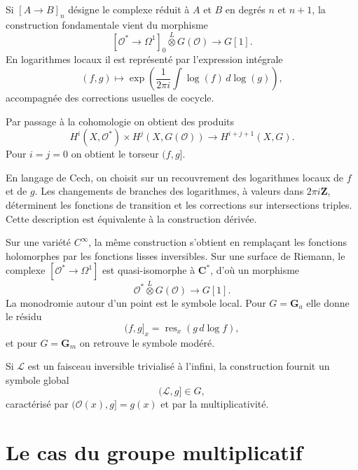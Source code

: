 \documentclass[11pt]{article}
\newcommand{\C}{\mathbf C}
\newcommand{\Z}{\mathbf Z}
\newcommand{\Gm}{\mathbf G_m}
\newcommand{\OO}{\mathcal O}
\newcommand{\LL}{\mathcal L}
\begin{document}
Si $[A\to B]_n$ désigne le complexe réduit à $A$ et $B$ en degrés $n$ et $n+1$, la construction fondamentale vient du morphisme
\begin{equation}\tag{2.2.1}
 [\OO^*\to\Omega^1]_0\overset L\otimes G(\OO)
 \longrightarrow G[1].
\end{equation}
En logarithmes locaux il est représenté par l'expression intégrale
\begin{equation}\tag{2.2.2}
 (f,g)\longmapsto \exp\left(\frac{1}{2\pi i}\int \log(f)\,d\log(g)\right),
\end{equation}
accompagnée des corrections usuelles de cocycle.

Par passage à la cohomologie on obtient des produits
\begin{equation}\tag{2.3.1}
 H^i(X,\OO^*)\times H^j(X,G(\OO))\longrightarrow H^{i+j+1}(X,G).
\end{equation}
Pour $i=j=0$ on obtient le torseur $(f,g]$.

En langage de Cech, on choisit sur un recouvrement des logarithmes locaux de $f$ et de $g$. Les changements de branches des logarithmes, à valeurs dans $2\pi i\Z$, déterminent les fonctions de transition et les corrections sur intersections triples. Cette description est équivalente à la construction dérivée.

Sur une variété $C^\infty$, la même construction s'obtient en remplaçant les fonctions holomorphes par les fonctions lisses inversibles. Sur une surface de Riemann, le complexe $[\OO^*\to\Omega^1]$ est quasi-isomorphe à $\C^*$, d'où un morphisme
\begin{equation}\tag{2.6.1}
 \OO^*\overset L\otimes G(\OO)\longrightarrow G[1].
\end{equation}
La monodromie autour d'un point est le symbole local. Pour $G=\mathbf G_a$ elle donne le résidu
\begin{equation}\tag{2.8.1}
 (f,g]_x=\operatorname{res}_x(g\,d\log f),
\end{equation}
et pour $G=\Gm$ on retrouve le symbole modéré.

Si $\LL$ est un faisceau inversible trivialisé à l'infini, la construction fournit un symbole global
\begin{equation}\tag{2.10.1}
 (\LL,g]\in G,
\end{equation}
caractérisé par $(\OO(x),g]=g(x)$ et par la multiplicativité.

\section{Le cas du groupe multiplicatif}
\end{document}
